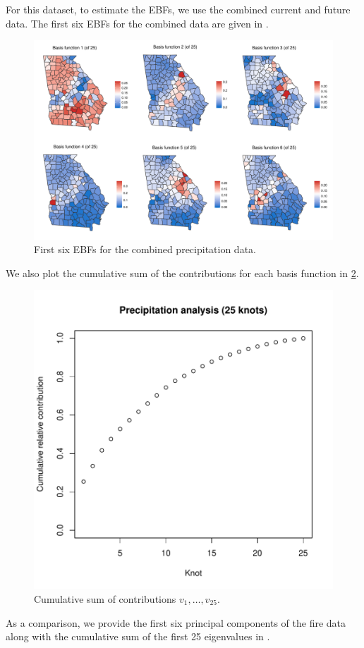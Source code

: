 \documentclass[11pt]{article}
\begin{document}
For this dataset, to estimate the EBFs, we use the combined current and future data.
The first six EBFs for the combined data are given in .
\begin{figure}[htbp]  %
  \centering
  \includegraphics[width=\linewidth]{plots/precip-ebf-panel.pdf}
  \caption{First six EBFs for the combined precipitation data.}
  \label{ebfig:precip-ebfpanel}
\end{figure}
We also plot the cumulative sum of the contributions for each basis function in \ref{ebfig:precip-v25}.
\begin{figure}[htbp] %
  \centering
  \includegraphics[width=0.5\linewidth]{plots/precipv-25.pdf}
  \caption{Cumulative sum of contributions $v_1, \ldots, v_25$.}
  \label{ebfig:precip-v25}
\end{figure}
As a comparison, we provide the first six principal components of the fire data along with the cumulative sum of the first 25 eigenvalues in .
\end{document}
